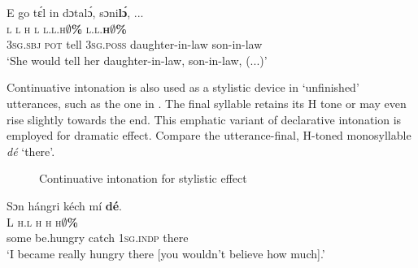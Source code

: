\ea%
    \label{ex:key:94}
    \glll   E    go  tɛ́l  in    dɔtalɔ́,      sɔni\textbf{lɔ́},  \op...\cp\\
\textsc{l}    \textsc{l}  \textsc{h}  \textsc{l}    \textsc{l.l.h}\textbf{\textsc{${\emptyset}$}}\textbf{\textsc{\%}}      \textsc{l.l.\textbf{h}}\textbf{\textsc{${\emptyset}$}}\textbf{\textsc{\%}}\\
\textsc{3sg.sbj}  \textsc{pot}  tell  \textsc{3sg.poss}  daughter-in-law  son-in-law\\
\glt ‘She would tell her daughter-in-law, son-in-law, (...)’  
\z


Continuative intonation is also used as a stylistic device in ‘unfinished’\textstyleannotationreference{} utterances, such as the one in . The final syllable retains its H tone or may even rise slightly towards the end. This emphatic variant of declarative intonation is employed for dramatic effect. Compare the utterance-final, H-toned monosyllable \textit{dé} ‘there’.

\begin{figure}
\caption{Continuative intonation for stylistic effect}
\label{fig:key:3.42}
\end{figure}


\ea%
    \label{ex:key:95}
    \glll   Sɔn    hángri    kéch  mí    \textbf{dé}.\\
L    \textsc{h.l}      \textsc{h}    \textsc{h}    \textsc{h}\textbf{\textsc{${\emptyset}$}}\textbf{\textsc{\%}}\\
some  be.hungry  catch  \textsc{1sg.indp}  there\\
\glt ‘I became really hungry there [you wouldn’t believe how much].’
\z

